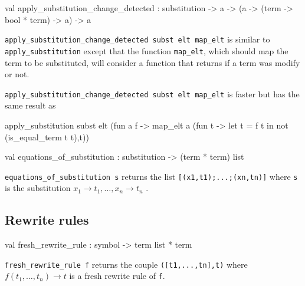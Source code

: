 \label{val:Term.apply-underscoresubstitution-underscorechange-underscoredetected}\begin{ocamldoccode}
val apply_substitution_change_detected :
  substitution ->
  {\textquotesingle}a -> ({\textquotesingle}a -> (term -> bool * term) -> {\textquotesingle}a) -> {\textquotesingle}a
\end{ocamldoccode}
\begin{ocamldocdescription}
{\tt{apply\_substitution\_change\_detected subst elt map\_elt}} is similar to {\tt{apply\_substitution}} 
    except that the function {\tt{map\_elt}}, which should map the term to be substituted, will consider
    a function that returns if a term was modify or not. 


    {\tt{apply\_substitution\_change\_detected subst elt map\_elt}} is faster but has the same result as 


\begin{ocamldoccode}
apply_substitution subst elt (fun a f -> 
  map_elt a (fun t ->
    let t{\textquotesingle} = f t in not (is_equal_term t t{\textquotesingle}),t{\textquotesingle}))
\end{ocamldoccode}



\end{ocamldocdescription}




\label{val:Term.equations-underscoreof-underscoresubstitution}\begin{ocamldoccode}
val equations_of_substitution : substitution -> (term * term) list
\end{ocamldoccode}
\begin{ocamldocdescription}
{\tt{equations\_of\_substitution s}} returns the list {\tt{[(x1,t1);...;(xn,tn)]}} where 
    {\tt{s}} is the substitution ${x_1 \rightarrow t_1, \ldots, x_n \rightarrow t_n}$ .


\end{ocamldocdescription}




\subsection{Rewrite rules}




\label{val:Term.fresh-underscorerewrite-underscorerule}\begin{ocamldoccode}
val fresh_rewrite_rule : symbol -> term list * term
\end{ocamldoccode}
\begin{ocamldocdescription}
{\tt{fresh\_rewrite\_rule f}} returns the couple {\tt{([t1,...,tn],t)}} where $f(t_1,\dots,t_n) \rightarrow t$ 
    is a fresh rewrite rule of {\tt{f}}.


\end{ocamldocdescription}




